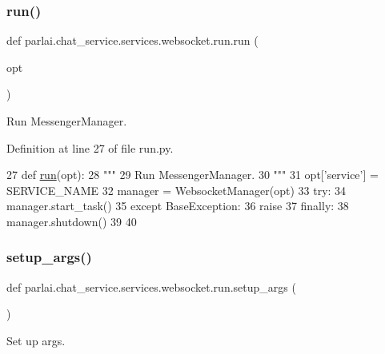 \subsubsection{\texorpdfstring{run()}{run()}}
{\footnotesize\ttfamily def parlai.\+chat\+\_\+service.\+services.\+websocket.\+run.\+run (\begin{DoxyParamCaption}\item[{}]{opt }\end{DoxyParamCaption})}

\begin{DoxyVerb}Run MessengerManager.
\end{DoxyVerb}
 

Definition at line 27 of file run.\+py.


\begin{DoxyCode}
27 \textcolor{keyword}{def }\hyperlink{namespaceparlai_1_1tasks_1_1talkthewalk_1_1run_a0a1ec08b8196cb008e4df83468c67e5b}{run}(opt):
28     \textcolor{stringliteral}{"""}
29 \textcolor{stringliteral}{    Run MessengerManager.}
30 \textcolor{stringliteral}{    """}
31     opt[\textcolor{stringliteral}{'service'}] = SERVICE\_NAME
32     manager = WebsocketManager(opt)
33     \textcolor{keywordflow}{try}:
34         manager.start\_task()
35     \textcolor{keywordflow}{except} BaseException:
36         \textcolor{keywordflow}{raise}
37     \textcolor{keywordflow}{finally}:
38         manager.shutdown()
39 
40 
\end{DoxyCode}
\mbox{\label{namespaceparlai_1_1chat__service_1_1services_1_1websocket_1_1run_a3335f62a1f0f68151449b8ecef1d9908}} 
\subsubsection{\texorpdfstring{setup\+\_\+args()}{setup\_args()}}
{\footnotesize\ttfamily def parlai.\+chat\+\_\+service.\+services.\+websocket.\+run.\+setup\+\_\+args (\begin{DoxyParamCaption}{ }\end{DoxyParamCaption})}

\begin{DoxyVerb}Set up args.
\end{DoxyVerb}
 

